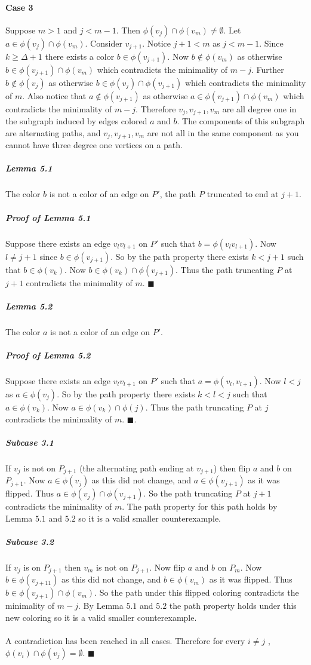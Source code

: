 \documentclass[letterpaper,12pt,oneside,onecolumn]{report}
\begin{document}
\paragraph{Case 3}
Suppose $m >1$ and $j < m-1$. Then $\phi(v_{j}) \cap \phi(v_m) \neq \emptyset$. Let $a \in \phi(v_{j}) \cap \phi(v_m)$. Consider $v_{j+1}$. Notice $j+1 < m$ as $j < m-1$. Since $k \geq \Delta + 1$ there exists a color $b \in \phi(v_{j+1})$. Now $b \not\in \phi(v_m)$ as otherwise $b \in \phi(v_{j+1}) \cap \phi(v_m)$ which contradicts the minimality of $m-j$. Further $b \not\in \phi(v_j)$ as otherwise $b\in \phi(v_j) \cap \phi(v_{j+1})$ which contradicts the minimality of $m$. Also notice that $a \not\in \phi(v_{j+1})$ as otherwise $a \in \phi(v_{j+1}) \cap \phi(v_m)$ which contradicts the minimality of $m - j$. Therefore $v_j, v_{j+1},v_m$ are all degree one in the subgraph induced by edges colored $a$ and $b$. The components of this subgraph are alternating paths, and $v_j, v_{j+1}, v_m$ are not all in the same component as you cannot have three degree one vertices on a path.
\subparagraph{Lemma 5.1}
The color $b$ is not a color of an edge on $P'$, the path $P$ truncated to end at $j+1$.
\subparagraph{Proof of Lemma 5.1}
Suppose there exists an edge $v_lv_{l+1}$ on $P'$ such that $b = \phi(v_lv_{l+1})$. Now $l \neq j+1$ since $b \in \phi(v_{j+1})$. So by the path property there exists $k < j+1$ such that $b \in \phi(v_{k})$. Now $b \in \phi(v_k) \cap \phi(v_{j+1})$. Thus the path truncating $P$ at $j+1$ contradicts the minimality of $m$. $\blacksquare$
\subparagraph{Lemma 5.2}
The color $a$ is not a color of an edge on $P'$.
\subparagraph{Proof of Lemma 5.2}
Suppose there exists an edge $v_lv_{l+1}$ on $P'$ such that $a = \phi(v_l,v_{l+1})$. Now $l < j$ as $a \in \phi(v_j)$. So by the path property there exists $k < l < j$ such that $a \in \phi(v_k)$. Now $a \in \phi(v_k) \cap \phi(j)$. Thus the path truncating $P$ at $j$ contradicts the minimality of $m$. $\blacksquare$. 
\subparagraph{Subcase 3.1}
If $v_j$ is not on $P_{j+1}$ (the alternating path ending at $v_{j+1}$) then flip $a$ and $b$ on $P_{j+1}$. Now $a \in \phi(v_j)$ as this did not change, and $a \in \phi(v_{j+1})$ as it was flipped. Thus $a \in \phi(v_j) \cap \phi(v_{j+1})$. So the path truncating $P$ at $j+1$ contradicts the minimality of $m$. The path property for this path holds by Lemma $5.1$ and $5.2$ so it is a valid smaller counterexample.
\subparagraph{Subcase 3.2}
If $v_j$ is on $P_{j+1}$ then $v_m$ is not on $P_{j+1}$. Now flip $a$ and $b$ on $P_{m}$. Now $b \in \phi(v_{j+11})$ as this did not change, and $b \in \phi(v_m)$ as it was flipped. Thus $b \in \phi(v_{j+1}) \cap \phi(v_m)$. So the path under this flipped coloring contradicts the minimality of $m-j$. By Lemma $5.1$ and $5.2$ the path property holds under this new coloring so it is a valid smaller counterexample.
\paragraph{}
A contradiction has been reached in all cases. Therefore for every $i \neq j$ , $\phi(v_i) \cap \phi(v_j) = \emptyset$. $\blacksquare$
\end{document}
